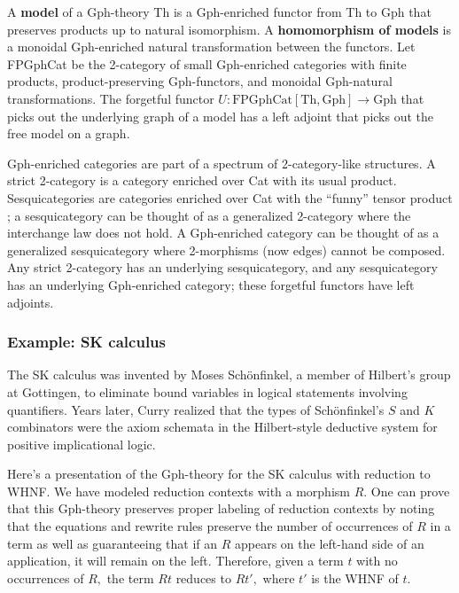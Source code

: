 \documentclass[submission,copyright,creativecommons]{eptcs}
\newcommand{\maps}{\colon}
\newcommand{\Th}{\mathrm{Th}}
\newcommand{\Gph}{\mathrm{Gph}}
\newcommand{\FPGphCat}{\mathrm{FPGphCat}}
\begin{document}
A {\bf model} of a Gph-theory Th is a Gph-enriched functor from Th to Gph that preserves products up to natural isomorphism.  A {\bf homomorphism of models} is a monoidal Gph-enriched natural transformation between the functors.  Let FPGphCat be the 2-category of small Gph-enriched categories with finite products, product-preserving Gph-functors, and monoidal Gph-natural transformations.  The forgetful functor $U\maps \FPGphCat[\Th, \Gph] \to \Gph$ that picks out the underlying graph of a model has a left adjoint that picks out the free model on a graph.

Gph-enriched categories are part of a spectrum of 2-category-like structures.  A strict 2-category is a category enriched over Cat with its usual product.  Sesquicategories are categories enriched over Cat with the ``funny'' tensor product \cite{Lack2010}; a sesquicategory can be thought of as a generalized 2-category where the interchange law does not hold.  A Gph-enriched category can be thought of as a generalized sesquicategory where 2-morphisms (now edges) cannot be composed.  Any strict 2-category has an underlying sesquicategory, and any sesquicategory has an underlying Gph-enriched category; these forgetful functors have left adjoints.

\subsubsection{Example: SK calculus}
\label{skexample}
The SK calculus was invented by Moses Sch\"onfinkel, a member of Hilbert's group at Gottingen, to eliminate bound variables in logical statements involving quantifiers.  Years later, Curry realized that the types of Sch\"onfinkel's $S$ and $K$ combinators were the axiom schemata in the Hilbert-style deductive system for positive implicational logic.

Here's a presentation of the Gph-theory for the SK calculus with reduction to WHNF.  We have modeled reduction contexts with a morphism $R.$  One can prove that this Gph-theory preserves proper labeling of reduction contexts by noting that the equations and rewrite rules preserve the number of occurrences of $R$ in a term as well as guaranteeing that if an $R$ appears on the left-hand side of an application, it will remain on the left.  Therefore, given a term $t$ with no occurrences of $R,$ the term $Rt$ reduces to $Rt',$ where $t'$ is the WHNF of $t.$
\end{document}
